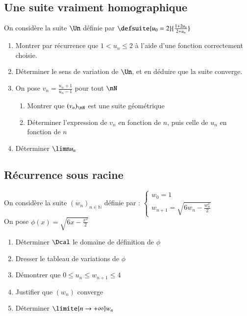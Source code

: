 \documentclass[oneside,12pt]{article}          %
\begin{document}
\subsection{Une suite vraiment homographique}
On considère la suite $\Un$ définie par $\defsuite{u_0=2}{\frac{1+2u_n}{2+u_n}}$ 
\begin{enumerate}
    \item Montrer par récurrence que $1<u_n\leq2$ à l'aide d'une fonction correctement choisie.
    \item Déterminer le sens de variation de $\Un$, et en déduire que la suite converge.
    \item On pose $v_n=\frac{u_n+1}{u_n-1}$ pour tout $\nN$
    \begin{enumerate}
        \item Montrer que $(v_n)_{\nN}$ est une suite géométrique
        \item Déterminer l'expression de $v_n$ en fonction de $n$, puis celle de $u_n$ en fonction de $n$
    \end{enumerate}
    \item Déterminer $\limn u_n$
\end{enumerate}



\subsection{Récurrence sous racine}
On considère la suite $(w_n)_{n \in \mathbb{N}}$ définie par : $\begin{cases}w_0 = 1\\w_{n+1}=\sqrt{6 w_n - \frac{w_n^2}{2}}\end{cases}$\\
On pose $\phi(x) = \sqrt{6x - \frac{x^2}{2}}$
\begin{enumerate}
    \item Déterminer $\Dcal$ le domaine de définition de $\phi$
    \item Dresser le tableau de variations de $\phi$
    \item Démontrer que $0 \leq u_n \leq w_{n+1} \leq 4$
    \item Justifier que $(w_n)$ converge
    \item Déterminer $\limite{n \to +\infty} w_n$
\end{enumerate}
\end{document}
